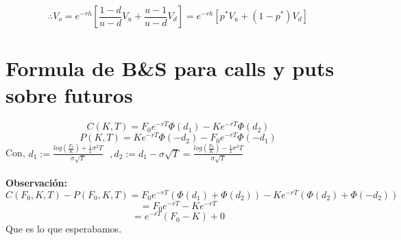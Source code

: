 \documentclass[12pts]{extarticle}
\begin{document}
$$\therefore V_o=e^{-rh}[\frac{1-d}{u-d}V_u + \frac{u-1}{u-d}V_d]=e^{-rh}[p^{*}V_u +(1-p^{*})V_d]$$ 

\section{Formula de B\&S para calls y puts sobre futuros}
$$C(K,T)=F_0e^{-rT}\Phi (d_1)-Ke^{-rT} \Phi (d_2)$$
$$P(K,T)=Ke^{-rT}\Phi (-d_2)-F_0e^{-rT} \Phi (-d_1)$$
Con, $d_1:=\frac{log(\frac{F_0}{K})+\frac{1}{2} \sigma^2 T}{\sigma\sqrt{T}} \, \, \,\,,  d_2:=d_1-\sigma \sqrt{T}=\frac{log(\frac{F_0}{K})-\frac{1}{2} \sigma^2 T}{\sigma\sqrt{T}}$
\\ 
\\
\textbf{Observación:}\\ 
$$C(F_0,K,T)-P(F_0,K,T)=F_0 e^{-rT}(\Phi (d_1)+\Phi (d_2))-Ke^{-rT}(\Phi (d_2)+\Phi (-d_2))$$ 
$$=F_0e^{-rT}-Ke^{-rT}$$
$$=e^{-rT}(F_0-K)+0$$
Que es lo que esperabamos. 
\end{document}
